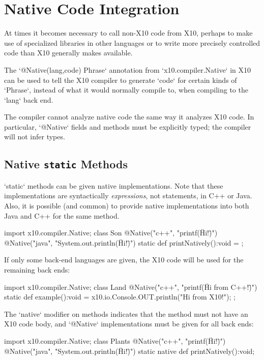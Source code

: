 \chapter{Native Code Integration}
\label{NativeCode}

At times it becomes necessary to call non-X10 code from X10, perhaps to make
use of specialized libraries in other languages or to write more precisely
controlled code than X10 generally makes available. 

The
\xcd`@Native(lang,code) Phrase` annotation from \xcd`x10.compiler.Native` in
X10 can be used to tell the X10 compiler to generate \xcd`code` for certain
kinds of \xcd`Phrase`, instead of what it would normally compile to, when
compiling to the \xcd`lang` back end.

The compiler cannot analyze native code the same way it analyzes X10 code.  In
particular, \xcd`@Native` fields and methods must be explicitly typed; the
compiler will not infer types.

\section{Native {\tt static} Methods}

\xcd`static` methods can be given native implementations.  Note that these
implementations are syntactically {\em expressions}, not statements, in C++ or
Java.   Also, it is possible (and common) to provide native implementations
into both Java and C++ for the same method.
\begin{xten}
import x10.compiler.Native;
class Son {
  @Native("c++", "printf(\"Hi!\")")
  @Native("java", "System.out.println(\"Hi!\")")
  static def printNatively():void = {};
}
\end{xten}
%

If only some back-end languages are given, the X10 code will be used for the
remaining back ends: 
\begin{xten}
import x10.compiler.Native;
class Land {
  @Native("c++", "printf(\"Hi from C++!\")")
  static def example():void = {
    x10.io.Console.OUT.println("Hi from X10!");
  };
}
\end{xten}
%

The \xcd`native` modifier on methods indicates that the method must not have
an X10 code body, and \xcd`@Native` implementations must be given for all back
ends:
\begin{xten}
import x10.compiler.Native;
class Plants {
  @Native("c++", "printf(\"Hi!\")")
  @Native("java", "System.out.println(\"Hi!\")")
  static native def printNatively():void;
}
\end{xten}
%


